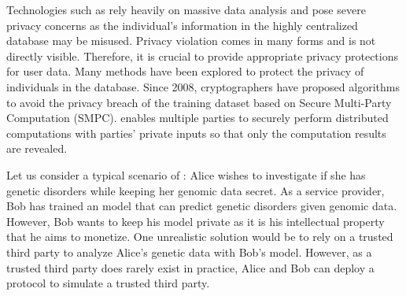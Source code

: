 




Technologies such as \machinelearning rely heavily on massive data analysis and pose severe privacy concerns as the individual's information in the highly centralized database may be misused. Privacy violation comes in many forms and is not directly visible. Therefore, it is crucial to provide appropriate privacy protections for user data.
Many methods have been explored to protect the privacy of individuals in the database.
Since 2008, cryptographers have proposed \ppml algorithms to avoid the privacy breach of the training dataset based on Secure Multi-Party Computation (SMPC). \smpc enables multiple parties to securely perform distributed computations with parties' private inputs so that only the computation results are revealed.

Let us consider a typical scenario of \ppml: Alice wishes to investigate if she has genetic disorders while keeping her genomic data secret. As a service provider, Bob has trained an \machinelearning model that can predict genetic disorders given genomic data. However, Bob wants to keep his \machinelearning model private as it is his intellectual property that he aims to monetize. One unrealistic solution would be to rely on a trusted third party to analyze Alice's genetic data with Bob's \machinelearning model. However, as a trusted third party does rarely exist in practice, Alice and Bob can deploy a \smpc protocol to simulate a trusted third party.

